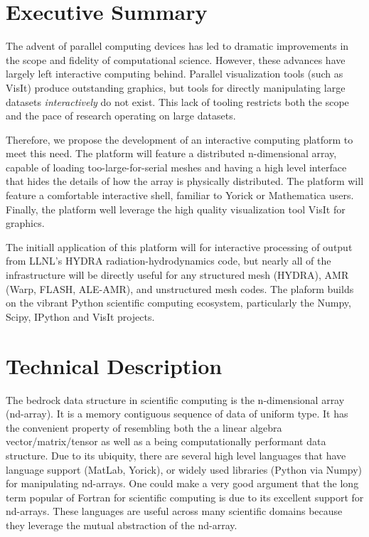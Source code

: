 \documentclass[a4paper]{article}
\begin{document}

\setlength{\parindent}{15pt}
\section*{Executive Summary }

The advent of parallel computing devices has led to dramatic improvements in the scope and fidelity of computational science.  However, these advances have largely left interactive computing behind.  Parallel visualization tools (such as VisIt) produce outstanding graphics, but tools for directly manipulating large datasets \emph{interactively} do not exist.  This lack of tooling restricts both the scope and the pace of research operating on large datasets.

Therefore, we propose the development of an interactive computing platform to meet this need.  The platform will feature a distributed n-dimensional array, capable of loading too-large-for-serial meshes and having a high level interface that hides the details of how the array is physically distributed.  The platform will feature a comfortable interactive shell, familiar to Yorick or Mathematica users.  Finally, the platform well leverage the high quality visualization tool VisIt for graphics.

The initiall application of this platform will for interactive processing of output from LLNL's HYDRA\cite{Marinak2001} radiation-hydrodynamics code, but nearly all of the infrastructure will be directly useful for any structured mesh (HYDRA), AMR (Warp\cite{Grote2005}, FLASH\cite{flash}, ALE-AMR\cite{Koniges2010}), and unstructured mesh codes.  The plaform builds on the vibrant Python scientific computing ecosystem, particularly the Numpy\cite{Oliphant2006}, Scipy\cite{numpyscipy}, IPython\cite{ipython} and VisIt\cite{VisIt} projects.


\section*{Technical Description}

The bedrock data structure in scientific computing is the n-dimensional array (nd-array).  It is a memory contiguous sequence of data of uniform type.  It has the convenient property of resembling both the a linear algebra vector/matrix/tensor as well as a being computationally performant data structure.  Due to its ubiquity, there are several high level languages that have language support (MatLab\cite{matlab}, Yorick\cite{Munro1995}), or widely used libraries (Python\cite{CPython} via Numpy\cite{Oliphant2006}) for manipulating nd-arrays.  One could make a very good argument that the long term popular of Fortran for scientific computing is due to its excellent support for nd-arrays.  These languages are useful across many scientific domains because they leverage the mutual abstraction of the nd-array.
\end{document}
